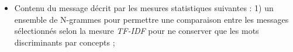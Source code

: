 \begin{itemize}

\item Contenu du message décrit par les mesures statistiques suivantes : 1) un ensemble de N-grammes pour permettre une comparaison entre les messages sélectionnés selon la mesure \emph{TF-IDF} pour ne conserver que les mots discriminants par concepts ; %

\end{itemize}
